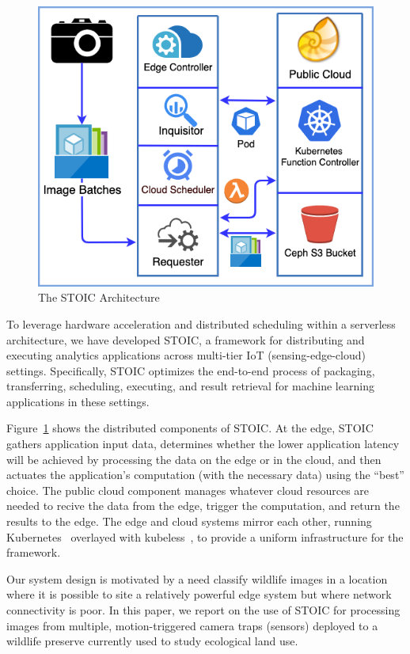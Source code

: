 \begin{figure}
    \centering
    \includegraphics[scale=0.4]{figures/STOIC.png}
    \caption{The STOIC Architecture \label{fig:STOIC}}
\end{figure}


To leverage hardware acceleration and distributed scheduling within a
serverless architecture, we have developed STOIC, a framework for distributing
and executing
analytics applications across multi-tier IoT (sensing-edge-cloud) settings. 
Specifically, STO\-IC
optimizes the end-to-end process of packaging, transferring, scheduling,
executing, and result retrieval for machine learning applications in these
settings.  

Figure~\ref{fig:STOIC} shows the distributed
components of STOIC. At the edge, STOIC gathers application input data,
determines whether the lower application latency will be achieved by
processing the data on the edge or in the cloud, and then actuates the
application's computation (with the necessary data) using the ``best'' choice.
The public cloud component manages whatever cloud resources are needed to
recive the data from the edge, trigger the computation, and return the
results to the edge.  The edge and cloud systems mirror each other, running
Kubernetes~\cite{ref:k8s-web,ref:k8s} overlayed with kubeless~\cite{ref:kubeless},
to provide a uniform infrastructure for the framework.

Our system design is motivated by a need 
classify wildlife images in a location where it is possible to site a
relatively powerful edge system but where network
connectivity is poor.  In this paper, we report on the use of STOIC 
for processing
images from multiple, motion-triggered camera traps (sensors) deployed to
a wildlife preserve currently used to study ecological land use.

